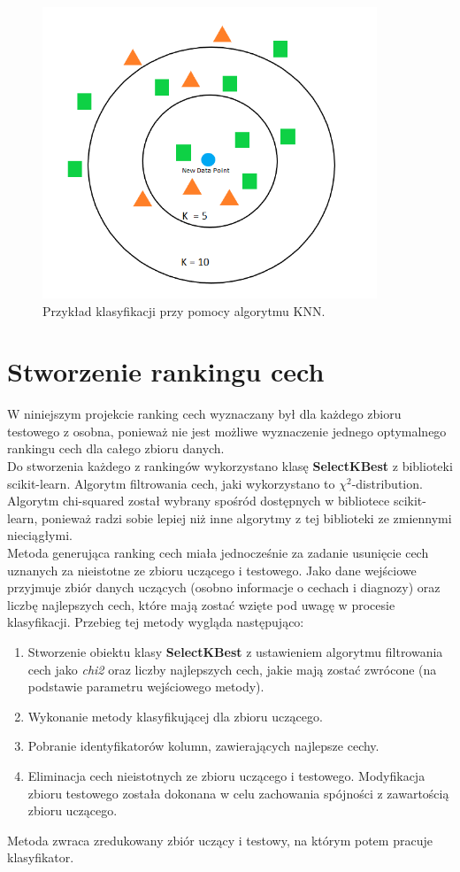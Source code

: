 \documentclass{article}
\begin{document}
\begin{figure}[h]
    \centering
    \noindent 
    \vspace{.2cm}
    \includegraphics[width=10cm]{kNN.png}
    \caption{Przykład klasyfikacji przy pomocy algorytmu KNN.}
    \label{fig:knn}
\end{figure}

\newpage

\section{Stworzenie rankingu cech}
W niniejszym projekcie ranking cech wyznaczany był dla każdego zbioru testowego z osobna, ponieważ nie jest możliwe wyznaczenie jednego optymalnego rankingu cech dla całego zbioru danych.\\
Do stworzenia każdego z rankingów wykorzystano klasę \textbf{SelectKBest} z biblioteki scikit-learn. Algorytm filtrowania cech, jaki wykorzystano to $\chi^2$-distribution. Algorytm chi-squared został wybrany spośród dostępnych w bibliotece scikit-learn, ponieważ radzi sobie lepiej niż inne algorytmy z tej biblioteki ze zmiennymi nieciągłymi.\\
Metoda generująca ranking cech miała jednocześnie za zadanie usunięcie cech uznanych za nieistotne ze zbioru uczącego i testowego. Jako dane wejściowe przyjmuje zbiór danych uczących (osobno informacje o cechach i diagnozy) oraz liczbę najlepszych cech, które mają zostać wzięte pod uwagę w procesie klasyfikacji. Przebieg tej metody wygląda następująco:
\begin{enumerate}
    \item Stworzenie obiektu klasy \textbf{SelectKBest} z ustawieniem algorytmu filtrowania cech jako \textit{chi2} oraz liczby najlepszych cech, jakie mają zostać zwrócone (na podstawie parametru wejściowego metody).
    \item Wykonanie metody klasyfikującej dla zbioru uczącego.
    \item Pobranie identyfikatorów kolumn, zawierających najlepsze cechy.
    \item Eliminacja cech nieistotnych ze zbioru uczącego i testowego. Modyfikacja zbioru testowego została dokonana w celu zachowania spójności z zawartością zbioru uczącego.
\end{enumerate}
Metoda zwraca zredukowany zbiór uczący i testowy, na którym potem pracuje klasyfikator.\\
\end{document}
